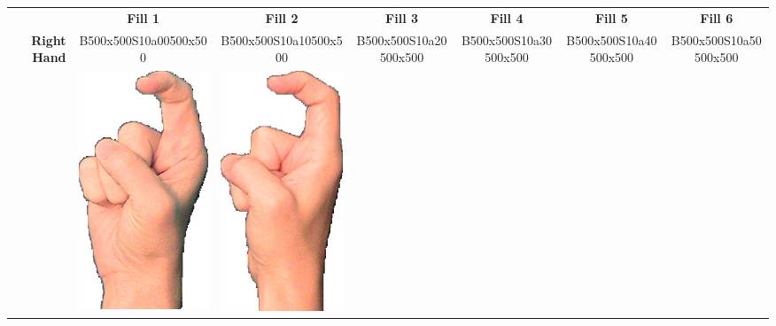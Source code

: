 \documentclass{article}
\begin{document}
\begin{center}
\begin{tabular}{r*{6}{c}}
&\textbf{Fill 1}&\textbf{Fill 2}&\textbf{Fill 3}&\textbf{Fill 4}&\textbf{Fill 5}&\textbf{Fill 6}\\
\multirow{2}{*}{\textbf{Right Hand}}&
B500x500S10a00500x500&
B500x500S10a10500x500&
B500x500S10a20500x500&
B500x500S10a30500x500&
B500x500S10a40500x500&
B500x500S10a50500x500\\
&
\includegraphics[scale=0.1]{images/01-05-1.jpg}&
\includegraphics[scale=0.1]{images/01-05-2.jpg}&

\end{tabular}
\end{center}
\end{document}
